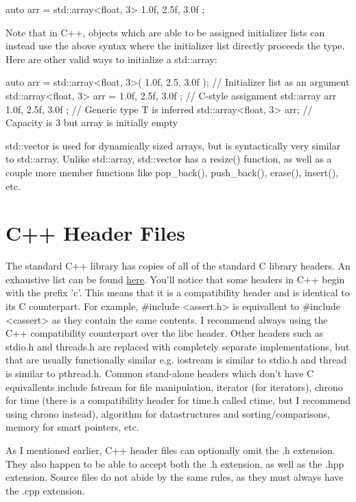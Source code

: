 \documentclass{article}
\begin{document}
\begin{cpplst}
auto arr = std::array<float, 3>{ 1.0f, 2.5f, 3.0f };
\end{cpplst}

Note that in C++, objects which are able to be assigned initializer lists can instead use the above syntax
where the initializer list directly proceeds the type. Here are other valid ways to initialize a std::array:

\begin{cpplst}
auto arr = std::array<float, 3>({ 1.0f, 2.5, 3.0f }); // Initializer list as an argument
std::array<float, 3> arr = { 1.0f, 2.5f, 3.0f }; // C-style assignment
std::array arr{ 1.0f, 2.5f, 3.0f }; // Generic type T is inferred
std::array<float, 3> arr{}; // Capacity is 3 but array is initially empty
\end{cpplst}

std::vector is used for dynamically sized arrays, but is syntactically very similar to std::array. Unlike
std::array, std::vector has a resize() function, as well as a couple more member functions like pop\_back(),
push\_back(), erase(), insert(), etc.

\section{C++ Header Files}

The standard C++ library has copies of all of the standard C library headers. An exhaustive list can be found
\href{https://en.cppreference.com/w/cpp/header}{here}. You'll notice that some headers in C++ begin with the
prefix 'c'. This means that it is a compatibility header and is identical to its C counterpart. For example,
\#include <assert.h> is equivallent to \#include <cassert> as they contain the same contents. I recommend
always using the C++ compatibility counterpart over the libc header. Other headers such as stdio.h and
threads.h are replaced with completely separate implementations, but that are usually functionally similar e.g.
iostream is similar to stdio.h and thread is similar to pthread.h. Common stand-alone headers which don't have
C equivallents include fstream for file manipulation, iterator (for iterators), chrono for time (there is a
compatibility header for time.h called ctime, but I recommend using chrono instead), algorithm for
datastructures and sorting/comparisons, memory for smart pointers, etc.

As I mentioned earlier, C++ header files can optionally omit the .h extension. They also happen to be able to
accept both the .h extension, as well as the .hpp extension. Source files do not abide by the same rules, as
they must always have the .cpp extension.
\end{document}
